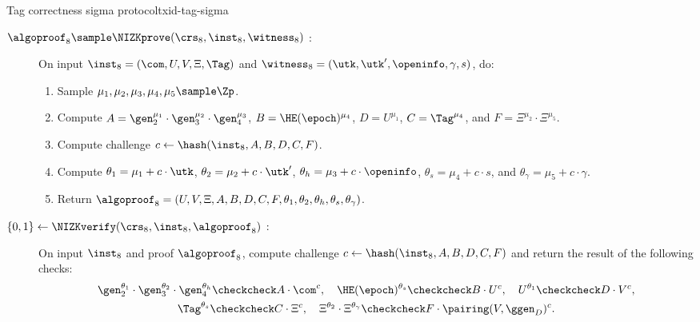 \begin{protocolbox}{Tag correctness sigma protocol}{txid-tag-sigma}

  \begin{description}

    \item[$\algoproof_8 \sample \NIZKprove(\crs_8, \inst_8, \witness_8)$ :] On
      input $\inst_8 = (\com, U, V, \Xi, \Tag)$ and $\witness_8 = (\utk, \utk',
      \openinfo, \gamma, s)$, do:

      \begin{enumerate}

        \item Sample $\mu_1, \mu_2, \mu_3, \mu_4, \mu_5 \sample \Zp$.

        \item Compute $A =
          \gen_2^{\mu_1}\cdot\gen_3^{\mu_2}\cdot\gen_4^{\mu_3}$, $B =
          \HE(\epoch)^{\mu_4}$, $D = U^{\mu_1}$, $C = \Tag^{\mu_4}$, and $F =
          \Xi^{\mu_2}\cdot\Xi^{\mu_5}$.

        \item Compute challenge $c \leftarrow \hash(\inst_8, A, B, D, C, F)$.

        \item Compute $\theta_1 = \mu_1 + c\cdot\utk$, $\theta_2 = \mu_2 +
          c\cdot\utk'$, $\theta_h = \mu_3 + c\cdot\openinfo$, $\theta_s = \mu_4
          + c\cdot s$, and $\theta_\gamma = \mu_5 + c\cdot\gamma$.

        \item Return $\algoproof_8 = (U, V, \Xi, A, B, D, C, F, \theta_1,
          \theta_2, \theta_h, \theta_s, \theta_\gamma)$.

      \end{enumerate}

    \item[$\{0,1\} \leftarrow \NIZKverify(\crs_8, \inst_8, \algoproof_8)$ :] On
      input $\inst_8$ and proof $\algoproof_8$, compute challenge $c \leftarrow
      \hash(\inst_8, A, B, D, C, F)$ and return the result of the following
      checks:
      \begin{gather*} \gen_2^{\theta_1}\cdot\gen_3^{\theta_2}\cdot
        \gen_4^{\theta_h} \checkcheck A \cdot \com^c, \quad
        \HE(\epoch)^{\theta_s} \checkcheck B \cdot U^c, \quad U^{\theta_1}
        \checkcheck D \cdot V^c, \\ \Tag^{\theta_s} \checkcheck C \cdot \Xi^c,
      \quad \Xi^{\theta_2}\cdot\Xi^{\theta_\gamma} \checkcheck F \cdot
    \pairing(V,\ggen_D)^c.  \end{gather*}

\end{description}

\end{protocolbox}

